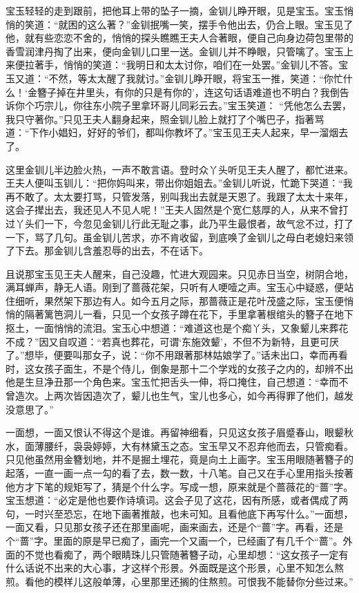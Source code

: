 \begin{parag}
    宝玉轻轻的走到跟前，把他耳上带的坠子一摘，金钏儿睁开眼，见是宝玉。宝玉悄悄的笑道：“就困的这么著？”金钏抿嘴一笑，摆手令他出去，仍合上眼。宝玉见了他，就有些恋恋不舍的，悄悄的探头瞧瞧王夫人合著眼，便自己向身边荷包里带的香雪润津丹掏了出来，便向金钏儿口里一送。金钏儿并不睁眼，只管噙了。宝玉上来便拉著手，悄悄的笑道：“我明日和太太讨你，咱们在一处罢。”金钏儿不答。宝玉又道：“不然，等太太醒了我就讨。”金钏儿睁开眼，将宝玉一推，笑道：“你忙什么！‘金簪子掉在井里头，有你的只是有你的’，连这句话语难道也不明白？我倒告诉你个巧宗儿，你往东小院子里拿环哥儿同彩云去。”宝玉笑道： “凭他怎么去罢，我只守著你。”只见王夫人翻身起来，照金钏儿脸上就打了个嘴巴子，指著骂道：“下作小娼妇，好好的爷们，都叫你教坏了。”宝玉见王夫人起来，早一溜烟去了。
\end{parag}


\begin{parag}
    这里金钏儿半边脸火热，一声不敢言语。登时众丫头听见王夫人醒了，都忙进来。王夫人便叫玉钏儿：“把你妈叫来，带出你姐姐去。”金钏儿听说，忙跪下哭道：“我再不敢了。太太要打骂，只管发落，别叫我出去就是天恩了。我跟了太太十来年，这会子撵出去，我还见人不见人呢！”王夫人固然是个宽仁慈厚的人，从来不曾打过丫头们一下，今忽见金钏儿行此无耻之事，此乃平生最恨者，故气忿不过，打了一下，骂了几句。虽金钏儿苦求，亦不肯收留，到底唤了金钏儿之母白老媳妇来领了下去。那金钏儿含羞忍辱的出去，不在话下。
\end{parag}


\begin{parag}
    且说那宝玉见王夫人醒来，自己没趣，忙进大观园来。只见赤日当空，树阴合地，满耳蝉声，静无人语。刚到了蔷薇花架，只听有人哽噎之声。宝玉心中疑惑，便站住细听，果然架下那边有人。如今五月之际，那蔷薇正是花叶茂盛之际，宝玉便悄悄的隔著篱笆洞儿一看，只见一个女孩子蹲在花下，手里拿著根绾头的簪子在地下抠土，一面悄悄的流泪。宝玉心中想道：“难道这也是个痴丫头，又象颦儿来葬花不成？”因又自叹道：“若真也葬花，可谓‘东施效颦’，不但不为新特，且更可厌了。”想毕，便要叫那女子，说：“你不用跟著那林姑娘学了。”话未出口，幸而再看时，这女孩子面生，不是个侍儿，倒象是那十二个学戏的女孩子之内的，却辨不出他是生旦净丑那一个角色来。宝玉忙把舌头一伸，将口掩住，自己想道：“幸而不曾造次。上两次皆因造次了，颦儿也生气，宝儿也多心，如今再得罪了他们，越发没意思了。”
\end{parag}


\begin{parag}
    一面想，一面又恨认不得这个是谁。再留神细看，只见这女孩子眉蹙春山，眼颦秋水，面薄腰纤，袅袅婷婷，大有林黛玉之态。宝玉早又不忍弃他而去，只管痴看。只见他虽然用金簪划地，并不是掘土埋花，竟是向土上画字。宝玉用眼随著簪子的起落，一直一画一点一勾的看了去，数一数，十八笔。自己又在手心里用指头按著他方才下笔的规矩写了，猜是个什么字。写成一想，原来就是个蔷薇花的“蔷”字。宝玉想道：“必定是他也要作诗填词。这会子见了这花，因有所感，或者偶成了两句，一时兴至恐忘，在地下画著推敲，也未可知。且看他底下再写什么。”一面想，一面又看，只见那女孩子还在那里画呢，画来画去，还是个“蔷”字。再看，还是个“蔷”字。里面的原是早已痴了，画完一个又画一个，已经画了有几千个“蔷”。外面的不觉也看痴了，两个眼睛珠儿只管随著簪子动，心里却想：“这女孩子一定有什么话说不出来的大心事，才这样个形景。外面既是这个形景，心里不知怎么熬煎。看他的模样儿这般单薄，心里那里还搁的住熬煎。可恨我不能替你分些过来。”
\end{parag}


